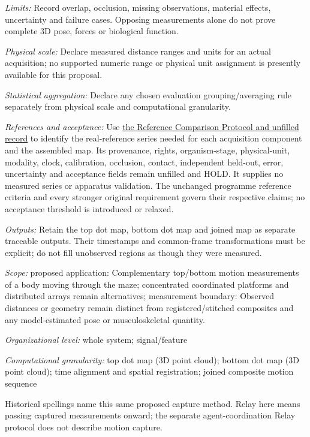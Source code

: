 \noindent\textit{Limits:} Record overlap, occlusion, missing observations, material effects, uncertainty and failure cases. Opposing measurements alone do not prove complete 3D pose, forces or biological function.\par
\noindent\textit{Physical scale:} Declare measured distance ranges and units for an actual acquisition; no supported numeric range or physical unit assignment is presently available for this proposal.\par
\noindent\textit{Statistical aggregation:} Declare any chosen evaluation grouping/averaging rule separately from physical scale and computational granularity.\par
\noindent\textit{References and acceptance:} Use \hyperref[app:reference-comparison-protocol]{the Reference Comparison Protocol and unfilled record} to identify the real-reference series needed for each acquisition component and the assembled map. Its provenance, rights, organism-stage, physical-unit, modality, clock, calibration, occlusion, contact, independent held-out, error, uncertainty and acceptance fields remain unfilled and HOLD. It supplies no measured series or apparatus validation. The unchanged programme reference criteria and every stronger original requirement govern their respective claims; no acceptance threshold is introduced or relaxed.\par
\noindent\textit{Outputs:} Retain the top dot map, bottom dot map and joined map as separate traceable outputs. Their timestamps and common-frame transformations must be explicit; do not fill unobserved regions as though they were measured.\par
\noindent\textit{Scope:} proposed application: Complementary top/bottom motion measurements of a body moving through the maze; concentrated coordinated platforms and distributed arrays remain alternatives; measurement boundary: Observed distances or geometry remain distinct from registered/stitched composites and any model-estimated pose or musculoskeletal quantity.\par
\noindent\textit{Organizational level:} whole system; signal/feature\par
\begin{samepage}
\noindent\textit{Computational granularity:} top dot map (3D point cloud); bottom dot map (3D point cloud); time alignment and spatial registration; joined composite motion sequence\par\nopagebreak[4]

\end{samepage}
\noindent Historical spellings name this same proposed capture method. Relay here means passing captured measurements onward; the separate agent-coordination Relay protocol does not describe motion capture.\par


